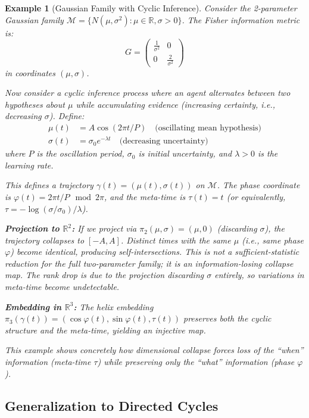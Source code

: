 \documentclass[12pt]{article}
\newtheorem{example}[theorem]{Example}
\newcommand{\R}{\mathbb{R}}
\newcommand{\M}{\mathcal{M}}
\begin{document}
\begin{example}[Gaussian Family with Cyclic Inference]\label{ex:gaussian}
Consider the 2-parameter Gaussian family $\M = \{N(\mu, \sigma^2) : \mu \in \R, \sigma > 0\}$. The Fisher information metric is:
\begin{equation}
    G = \begin{pmatrix} \frac{1}{\sigma^2} & 0 \\ 0 & \frac{2}{\sigma^2} \end{pmatrix}
\end{equation}
in coordinates $(\mu, \sigma)$.

Now consider a cyclic inference process where an agent alternates between two hypotheses about $\mu$ while accumulating evidence (increasing certainty, i.e., decreasing $\sigma$). Define:
\begin{align}
    \mu(t) &= A \cos(2\pi t / P) \quad \text{(oscillating mean hypothesis)} \\
    \sigma(t) &= \sigma_0 e^{-\lambda t} \quad \text{(decreasing uncertainty)}
\end{align}
where $P$ is the oscillation period, $\sigma_0$ is initial uncertainty, and $\lambda > 0$ is the learning rate.

This defines a trajectory $\gamma(t) = (\mu(t), \sigma(t))$ on $\M$. The phase coordinate is $\varphi(t) = 2\pi t / P \mod 2\pi$, and the meta-time is $\tau(t) = t$ (or equivalently, $\tau = -\log(\sigma/\sigma_0)/\lambda$).

\textbf{Projection to $\R^2$:} If we project via $\pi_2(\mu, \sigma) = (\mu, 0)$ (discarding $\sigma$), the trajectory collapses to $[-A, A]$. Distinct times with the same $\mu$ (i.e., same phase $\varphi$) become identical, producing self-intersections. This is \emph{not} a sufficient-statistic reduction for the full two-parameter family; it is an information-losing collapse map. The rank drop is due to the projection discarding $\sigma$ entirely, so variations in meta-time become undetectable.

\textbf{Embedding in $\R^3$:} The helix embedding $\pi_3(\gamma(t)) = (\cos\varphi(t), \sin\varphi(t), \tau(t))$ preserves both the cyclic structure and the meta-time, yielding an injective map.

This example shows concretely how dimensional collapse forces loss of the ``when'' information (meta-time $\tau$) while preserving only the ``what'' information (phase $\varphi$).
\end{example}

\subsection{Generalization to Directed Cycles}
\end{document}
